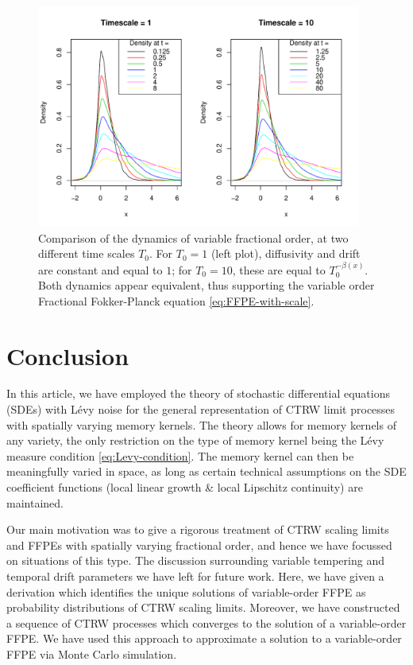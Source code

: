 \documentclass[a4paper,12pt]{elsarticle}
\numberwithin{equation}{section}
\theoremstyle{plain}
\theoremstyle{definition}
\theoremstyle{remark}
\numberwithin{equation}{section}
\newcommand{\1}{\mathbf 1}
\begin{document}
\begin{figure}[h]
\centering
\includegraphics[width = 0.95\textwidth]{densities.pdf}
\caption{Comparison of the dynamics of variable fractional order, at two different time scales $T_0$. For $T_0 = 1$ (left plot), diffusivity and drift are constant and equal to $1$; for $T_0 = 10$, these are equal to $T_0^{-\beta(x)}$. Both dynamics appear equivalent, thus supporting the variable order Fractional Fokker-Planck equation \eqref{eq:FFPE-with-scale}.}
\end{figure}


\section{Conclusion}

In this article, we have employed the theory of stochastic differential equations (SDEs) with
L\'evy noise for the general representation of CTRW limit processes with spatially varying memory kernels.  The theory allows for memory kernels of any variety, 
the only restriction on the type of memory kernel being the L\'evy measure condition \eqref{eq:Levy-condition}.  The memory kernel can then be meaningfully varied in space, as long as certain technical assumptions on the SDE coefficient functions (local linear growth \& local Lipschitz continuity) are maintained.  

Our main motivation was to give a rigorous treatment of CTRW scaling limits and FFPEs with spatially varying fractional order, and hence we have focussed on situations of this type. The discussion surrounding variable tempering and temporal drift parameters we have left for future work.  
Here, we have given a derivation which identifies the unique solutions of variable-order FFPE as probability distributions of CTRW scaling limits. 
Moreover, we have constructed a sequence of CTRW processes which converges to the solution of a variable-order FFPE.  We have used this approach to approximate a solution to a variable-order FFPE via Monte Carlo simulation.
\end{document}
